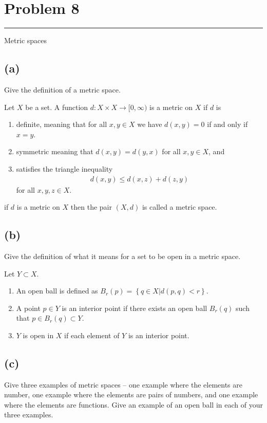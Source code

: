 \documentclass[12pt]{amsart}
\newcommand{\usec}[1]{%
\section*{#1}%
\noindent\rule{\textwidth}{2pt}%
\vspace{10pt}%
}
\newcommand{\gtodo}[1]{\todo[inline, color=green]{#1}}
\begin{document}
\gtodo{More?}

\usec{Problem 8}%
\label{sec:problem_8}

Metric spaces

\subsection*{(a)}%
\label{sub:_a_}

Give the definition of a metric space.

Let $X$ be a set. A function $d:X\times X\to[0,\infty)$ is a metric on $X$ if
$d$ is
\begin{enumerate}
  \item definite, meaning that for all $x,y\in X$ we have $d(x,y)=0$ if and
    only if $x=y$.
  \item symmetric meaning that $d(x,y)=d(y,x)$ for all $x,y\in X$, and
  \item satisfies the triangle inequality
    \begin{align*}
      d(x,y)\leq d(x,z)+d(z,y)
    \end{align*}
    for all $x,y,z\in X$.
\end{enumerate}
if $d$ is a metric on $X$ then the pair $(X,d)$ is called a metric space.

\subsection*{(b)}%
\label{sub:_b_}

Give the definition of what it means for a set to be open in a metric space.

Let $Y\subset X$.
\begin{enumerate}
  \item An open ball is defined as $B_r(p)=\left\{q\in X\vert
    d(p,q)<r\right\}$.
  \item A point $p\in Y$ is an interior point if there exists an open ball
    $B_r(q)$ such that $p\in B_r(q)\subset Y$.
  \item $Y$ is open in $X$ if each element of $Y$ is an interior point.
\end{enumerate}

\subsection*{(c)}%
\label{sub:_c_}

Give three examples of metric spaces -- one example where the elements are
number, one example where the elements are pairs of numbers, and one example
where the elements are functions. Give an example of an open ball in each of
your three examples.
\end{document}

